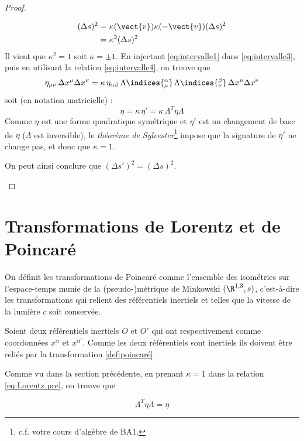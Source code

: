 \begin{proof}
\begin{enumerate}
        \begin{align}
            (\Delta s)^2 &= \kappa(\vect{v}) \kappa(-\vect{v}) (\Delta s)^2\\
            &= \kappa^2(\Delta s)^2
        \end{align}
        Il vient que $\kappa ^2= 1$ soit $\kappa = \pm 1$. En injectant \ref{eq:intervalle1} dans \ref{eq:intervalle3}, puis en utilisant la relation \ref{eq:intervalle4}, on trouve que
        \begin{equation}
            \eta_{\mu\nu} \, \Delta x^\mu \Delta x^\nu = \kappa \, \eta_{\alpha\beta} \, \Lambda\indices{^\alpha_{\mu}} \, \Lambda\indices{^\beta_{\nu}}\, \Delta x^\mu \Delta x^\nu
        \end{equation}
        soit (en notation matricielle) :
        \begin{equation}
            \label{eq:Lorentz pre}
            \eta = \kappa \,\eta'=\kappa \,\Lambda^T\eta \Lambda
        \end{equation}
        Comme $\eta$ est une forme quadratique symétrique et $\eta'$ est un changement de base de $\eta$ ($\Lambda$ est inversible), le \textit{théorème de Sylvester}\footnote{c.f. votre cours d'algèbre de BA1.} impose que la signature de $\eta'$ ne change pas, et donc que $\kappa=1$.

        On peut ainsi conclure que $(\Delta s')^2 = (\Delta s)^2$.
    \end{enumerate}
\end{proof}

\section{Transformations de Lorentz et de Poincaré}

On définit les transformations de Poincaré comme l'ensemble des isométries sur l'espace-temps munie de la (pseudo-)métrique de Minkowski $(\R^{1,3},s)$, c'est-à-dire les transformations qui relient des référentiels inertiels et telles que la vitesse de la lumière $c$ soit conservée.

Soient deux référentiels inertiels $O$ et $O'$ qui ont respectivement comme coordonnées $x^{\alpha}$ et $x^{\alpha '}$. 
Comme les deux référentiels sont inertiels ils doivent être reliés par la transformation \ref{def:poincaré}. 

Comme vu dans la section précédente, en prenant $\kappa = 1$ dans la relation \ref{eq:Lorentz pre}, on trouve que

\begin{equation}
    \label{eq:Lorentz}
    \boxed{\Lambda ^{T} \eta \Lambda = \eta}
\end{equation}

